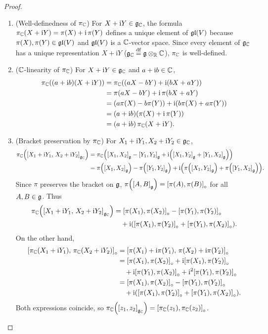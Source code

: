 \documentclass[11pt,reqno]{amsart}
\newcommand{\ii}{\mathrm{i}}
\begin{document}
\begin{proof}
\begin{enumerate}
\item (Well-definedness of $\pi_{\mathbb{C}}$)
For $X+\ii Y\in\g_\C$, the formula
$\pi_\C(X+\ii Y)=\pi(X)+\ii\,\pi(Y)$ defines a unique element of
$\mathfrak{gl}(V)$ because $\pi(X),\pi(Y)\in\mathfrak{gl}(V)$ and $\mathfrak{gl}(V)$ is a $\mathbb{C}$-vector space.
Since every element of $\mathfrak{g}_{\mathbb{C}}$ has a unique representation $X+\ii Y$
($\mathfrak{g}_{\mathbb{C}}\stackrel{\mathrm{df}}{=}\mathfrak{g}\otimes_{\mathbb{R}}\mathbb{C}$), $\pi_{\mathbb{C}}$ is well-defined.

\item ($\mathbb{C}$-linearity of $\pi_{\mathbb{C}}$)
For $X+\ii Y\in\g_\C$ and $a+\ii b\in\C$,
\[
\begin{aligned}
\pi_\C\Br{(a+\ii b)(X+\ii Y)}
&=\pi_\C\Br{(aX-bY)+\ii(bX+aY)} \\
&=\pi(aX-bY)+\ii\,\pi(bX+aY) \\
&=\Br{a\pi(X)-b\pi(Y)}+\ii\Br{b\pi(X)+a\pi(Y)} \\
&=(a+\ii b)\Br{\pi(X)+\ii\,\pi(Y)} \\
&=(a+\ii b)\,\pi_\C(X+\ii Y).
\end{aligned}
\]

\item (Bracket preservation by $\pi_{\mathbb{C}}$)
For $X_1+\ii Y_1,X_2+\ii Y_2\in\g_\C$,
\[
\begin{aligned}
\pi_\C\Br{\SqBr{X_1+\ii Y_1,\,X_2+\ii Y_2}_{\g_\C}}
&=\pi_\C\Br{\SqBr{X_1,X_2}_\g-\SqBr{Y_1,Y_2}_\g
+\ii\Br{\SqBr{X_1,Y_2}_\g+\SqBr{Y_1,X_2}_\g}} \\
&=\pi\Br{\SqBr{X_1,X_2}_\g}-\pi\Br{\SqBr{Y_1,Y_2}_\g}
+\ii\Br{\pi\Br{\SqBr{X_1,Y_2}_\g}+\pi\Br{\SqBr{Y_1,X_2}_\g}}.
\end{aligned}
\]
Since $\pi$ preserves the bracket on $\mathfrak{g}$,
$\pi\Br{\SqBr{A,B}_\g}=\SqBr{\pi(A),\pi(B)}_\circ$ for all $A,B\in\mathfrak{g}$.
Thus
\[
\begin{aligned}
\pi_\C\Br{\SqBr{X_1+\ii Y_1,\,X_2+\ii Y_2}_{\g_\C}}
&=\SqBr{\pi(X_1),\pi(X_2)}_\circ-\SqBr{\pi(Y_1),\pi(Y_2)}_\circ \\
&\quad+\ii\Br{\SqBr{\pi(X_1),\pi(Y_2)}_\circ+\SqBr{\pi(Y_1),\pi(X_2)}_\circ}.
\end{aligned}
\]
On the other hand,
\[
\begin{aligned}
\SqBr{\pi_\C(X_1+\ii Y_1),\,\pi_\C(X_2+\ii Y_2)}_\circ
&=\SqBr{\pi(X_1)+\ii\pi(Y_1),\,\pi(X_2)+\ii\pi(Y_2)}_\circ \\
&=\SqBr{\pi(X_1),\pi(X_2)}_\circ
+\ii\SqBr{\pi(X_1),\pi(Y_2)}_\circ \\
&\quad+\ii\SqBr{\pi(Y_1),\pi(X_2)}_\circ
+\ii^2\SqBr{\pi(Y_1),\pi(Y_2)}_\circ \\
&=\SqBr{\pi(X_1),\pi(X_2)}_\circ-\SqBr{\pi(Y_1),\pi(Y_2)}_\circ \\
&\quad+\ii\Br{\SqBr{\pi(X_1),\pi(Y_2)}_\circ+\SqBr{\pi(Y_1),\pi(X_2)}_\circ}.
\end{aligned}
\]
Both expressions coincide, so
$\pi_\C\Br{\SqBr{z_1,z_2}_{\g_\C}}=\SqBr{\pi_\C(z_1),\pi_\C(z_2)}_\circ$.


\end{enumerate}
\end{proof}
\end{document}
